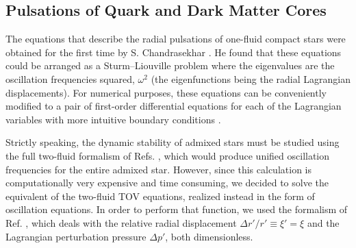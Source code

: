 \documentclass[universe,article,accept,moreauthors,pdftex]{Definitions/mdpi}
\begin{document}
\subsection{Pulsations of Quark and Dark Matter Cores}
  
The equations that describe the radial pulsations of one-fluid compact stars were obtained for the first time by S. Chandrasekhar \cite{Chandrasekhar:1964zza}. He found that these equations could be arranged as a Sturm--Liouville problem where the eigenvalues are the oscillation frequencies squared, $\omega^{2}$ (the eigenfunctions being the radial Lagrangian displacements). For numerical purposes, these equations can be conveniently modified to a pair of first-order differential equations for each of the Lagrangian variables with more intuitive boundary conditions \cite{Misner:1973prb,Chanmugam:1977,Glass:1983,Gondek:1997fd,Kokkotas:2000up}.

Strictly speaking, the dynamic stability of admixed stars must be studied using the full two-fluid formalism of Refs. \cite{Leung:2012vea,Kain:2020zjs}, which would produce unified oscillation frequencies for the entire admixed star. However, since this calculation is computationally very expensive and time consuming, we decided to solve the equivalent of the two-fluid TOV equations, realized instead in the form of oscillation equations. In order to perform that function, we used the formalism of Ref. \cite{Gondek:1997fd}, which deals with the relative radial displacement $\Delta{r'}/r'\equiv\xi'=\xi$ and the Lagrangian perturbation pressure $\Delta{p'}$, both dimensionless. 
\end{document}
